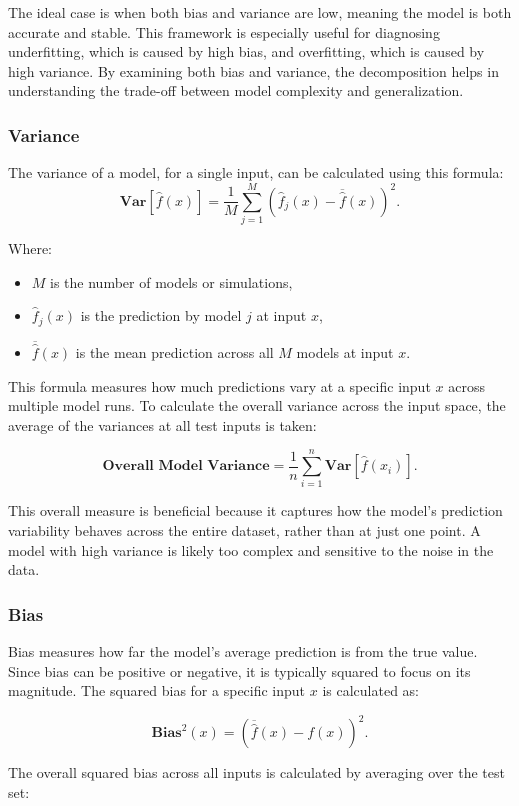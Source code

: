 The ideal case is when both bias and variance are low, meaning the model is both accurate and stable. This framework is especially useful for diagnosing underfitting, which is caused by high bias, and overfitting, which is caused by high variance. By examining both bias and variance, the decomposition helps in understanding the trade-off between model complexity and generalization.

\subsubsection{Variance}
The variance of a model, for a single input, can be calculated using this formula:
$$
\textbf{Var}[\hat{f}(x)] = \frac{1}{M} \sum_{j=1}^{M} (\hat{f}_j(x) - \overline{\hat{f}}(x))^{2}.
$$

Where:
\begin{itemize}
	\item $M$ is the number of models or simulations,
	\item $\hat{f}_j(x)$ is the prediction by model $j$ at input $x$,
	\item $\overline{\hat{f}}(x)$ is the mean prediction across all $M$ models at input $x$.
\end{itemize}

This formula measures how much predictions vary at a specific input $x$ across multiple model runs. To calculate the overall variance across the input space, the average of the variances at all test inputs is taken:

$$
\textbf{Overall Model Variance} = \frac{1}{n} \sum_{i=1}^{n} \textbf{Var}[\hat{f}(x_i)].
$$

This overall measure is beneficial because it captures how the model’s prediction variability behaves across the entire dataset, rather than at just one point. A model with high variance is likely too complex and sensitive to the noise in the data.

\subsubsection{Bias}
Bias measures how far the model’s average prediction is from the true value. Since bias can be positive or negative, it is typically squared to focus on its magnitude. The squared bias for a specific input $x$ is calculated as:

$$
\textbf{Bias}^2(x) = (\overline{\hat{f}}(x) - f(x))^{2}.
$$

The overall squared bias across all inputs is calculated by averaging over the test set:

